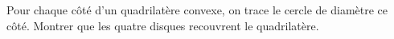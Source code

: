 Pour chaque côté d'un quadrilatère convexe, on trace le cercle de diamètre ce côté. Montrer que les quatre disques recouvrent le quadrilatère.
